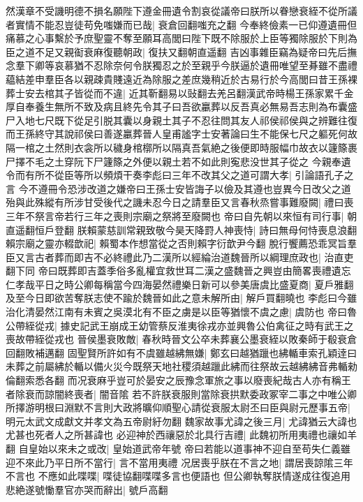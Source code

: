 然漢章不受譏明德不損名願陛下遵金冊遺令割哀從議帝曰朕所以眷戀衰絰不從所議者實情不能忍豈徒苟免嗤嫌而已哉|{
	衰倉回翻嗤充之翻}
今奉終儉素一已仰遵遺冊但痛慕之心事繫於予庶聖靈不奪至願耳高閭曰陛下既不除服於上臣等獨除服於下則為臣之道不足又親䘖衰麻復聽朝政|{
	復扶又翻朝直遥翻}
吉凶事雜臣竊為疑帝曰先后撫念羣下卿等哀慕猶不忍除奈何令朕獨忍之於至親乎今朕逼於遺冊唯望至朞雖不盡禮藴結差申羣臣各以親疎貴賤遠近為除服之差庶幾稍近於古易行於今高閭曰昔王孫裸葬士安去棺其子皆從而不違|{
	近其靳翻易以䜴翻去羌呂翻漢武帝時楊王孫家累千金厚自奉養生無所不致及病且終先令其子曰吾欲臝葬以反吾真必無易吾志則為布囊盛尸入地七尺既下從足引脱其囊以身親土其子不忍往問其友人祁侯祁侯與之辨難往復而王孫終守其說祁侯曰善遂臝葬晉人皇甫謐字士安著論曰生不能保七尺之軀死何故隔一棺之土然則衣衾所以穢身棺槨所以隔真吾氣絶之後便即時服幅巾故衣以籧篨裹尸擇不毛之土穿阮下尸籧篨之外便以親土若不如此則寃悲没世其子從之}
今親奉遺令而有所不從臣等所以頻煩干奏李彪曰三年不改其父之道可謂大孝|{
	引論語孔子之言}
今不遵冊令恐涉改道之嫌帝曰王孫士安皆誨子以儉及其遵也豈異今日改父之道殆與此殊縱有所涉甘受後代之譏未忍今日之請羣臣又言春秋烝嘗事難廢闕|{
	禮曰喪三年不祭言帝若行三年之喪則宗廟之祭將至廢闕也}
帝曰自先朝以來恒有司行事|{
	朝直遥翻恒戶登翻}
朕賴蒙慈訓常親致敬今昊天降罸人神喪恃|{
	詩曰無母何恃喪息浪翻}
賴宗廟之靈亦輟歆祀|{
	賴蜀本作想當從之否則賴字衍歆尹今翻}
脫行饗薦恐乖冥旨羣臣又言古者葬而即吉不必終禮此乃二漢所以經綸治道魏晉所以綱理庶政也|{
	治直吏翻下同}
帝曰既葬即吉蓋季俗多亂權宜救世耳二漢之盛魏晉之興豈由簡畧喪禮遺忘仁孝哉平日之時公卿每稱當今四海晏然禮樂日新可以參美唐虞比盛夏商|{
	夏戶雅翻}
及至今日即欲苦奪朕志使不踰於魏晉如此之意未解所由|{
	解戶買翻曉也}
李彪曰今雖治化清晏然江南有未賓之吳漠北有不臣之虜是以臣等猶懷不虞之慮|{
	虞防也}
帝曰魯公帶絰從戎|{
	據史記武王崩成王幼管蔡反淮夷徐戎亦並興魯公伯禽征之時有武王之喪故帶絰從戎也}
晉侯墨衰敗敵|{
	春秋時晉文公卒未葬襄公墨衰絰以敗秦師于殽衰倉回翻敗補邁翻}
固聖賢所許如有不虞雖越紼無嫌|{
	鄭玄曰越猶躐也紼輴車索孔穎逹曰未葬之前屬紼於輴以備火災今既祭天地社稷須越躐此紼而往祭故云越紼紼音弗輴勑倫翻索悉各翻}
而况衰麻乎豈可於晏安之辰豫念軍旅之事以廢喪紀哉古人亦有稱王者除衰而諒闇終喪者|{
	闇音隂}
若不許朕衰服則當除衰拱默委政冢宰二事之中唯公卿所擇游明根曰淵默不言則大政將曠仰順聖心請從衰服太尉丕曰臣與尉元歷事五帝|{
	明元太武文成獻文并孝文為五帝尉紆勿翻}
魏家故事尤諱之後三月|{
	尤諱猶云大諱也尤甚也死者人之所甚諱也}
必迎神於西禳惡於北具行吉禮|{
	此魏初所用夷禮也禳如羊翻}
自皇始以來未之或改|{
	皇始道武帝年號}
帝曰若能以道事神不迎自至苟失仁義雖迎不來此乃平日所不當行|{
	言不當用夷禮}
况居喪乎朕在不言之地|{
	謂居喪諒隂三年不言也}
不應如此喋喋|{
	喋徒協翻喋喋多言也便語也}
但公卿執奪朕情遂成往復追用悲絶遂號慟羣官亦哭而辭出|{
	號戶高翻}
